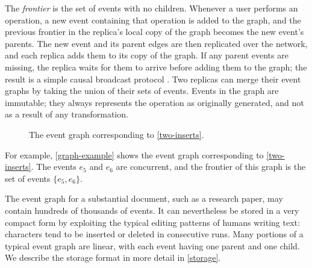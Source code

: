 \documentclass[sigplan,10pt]{acmart}
\begin{document}
The \emph{frontier} is the set of events with no children.
Whenever a user performs an operation, a new event containing that operation is added to the graph, and the previous frontier in the replica's local copy of the graph becomes the new event's parents.
The new event and its parent edges are then replicated over the network, and each replica adds them to its copy of the graph.
If any parent events are missing, the replica waits for them to arrive before adding them to the graph; the result is a simple causal broadcast protocol \cite{Birman1991,Cachin2011}.
Two replicas can merge their event graphs by taking the union of their sets of events.
Events in the graph are immutable; they always represents the operation as originally generated, and not as a result of any transformation.

\begin{figure}
  \caption{The event graph corresponding to \autoref{two-inserts}.}
  \label{graph-example}
\end{figure}

For example, \autoref{graph-example} shows the event graph corresponding to \autoref{two-inserts}.
The events $e_5$ and $e_6$ are concurrent, and the frontier of this graph is the set of events $\{e_5, e_6\}$.

The event graph for a substantial document, such as a research paper, may contain hundreds of thousands of events.
It can nevertheless be stored in a very compact form by exploiting the typical editing patterns of humans writing text: characters tend to be inserted or deleted in consecutive runs.
Many portions of a typical event graph are linear, with each event having one parent and one child.
We describe the storage format in more detail in \autoref{storage}.
\end{document}
